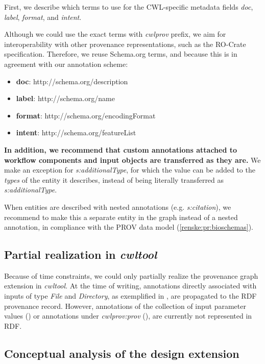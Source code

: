First, we describe which terms to use for the CWL-specific metadata fields \emph{doc}, \emph{label}, \emph{format}, and \emph{intent}.

Although we could use the exact terms with \emph{cwlprov} prefix, we aim for interoperability with other provenance representations, such as the RO-Crate specification. Therefore, we reuse Schema.org terms, and because this is in agreement with our annotation scheme:

\begin{itemize}
    \item \textbf{doc}: http://schema.org/description
    \item \textbf{label}: http://schema.org/name
    \item \textbf{format}: http://schema.org/encodingFormat
    \item \textbf{intent}: http://schema.org/featureList
\end{itemize}

\textbf{In addition, we recommend that custom annotations attached to workflow components and input objects are transferred as they are.} We make an exception for \emph{s:additionalType}, for which the value can be added to the \emph{types} of the entity it describes, instead of being literally transferred as \emph{s:additionalType}.

When entities are described with nested annotations (e.g. \emph{s:citation}), we recommend to make this a separate entity in the graph instead of a nested annotation, in compliance with the PROV data model (\ref{renske:pr:bioschemas}).

\subsection{Partial realization in \emph{cwltool}}
\label{sec:renske:realization}
Because of time constraints, we could only partially realize the provenance graph extension in \emph{cwltool}. At the time of writing, annotations directly associated with inputs of type \emph{File} and \emph{Directory}, as exemplified in \emph{}, are propagated to the RDF provenance record. However, annotations of the collection of input parameter values (\emph{}) or annotations under \emph{cwlprov:prov} (\emph{}), are currently not represented in RDF.

\subsection{Conceptual analysis of the design extension}
\label{sec:renske:ext_analysis}

